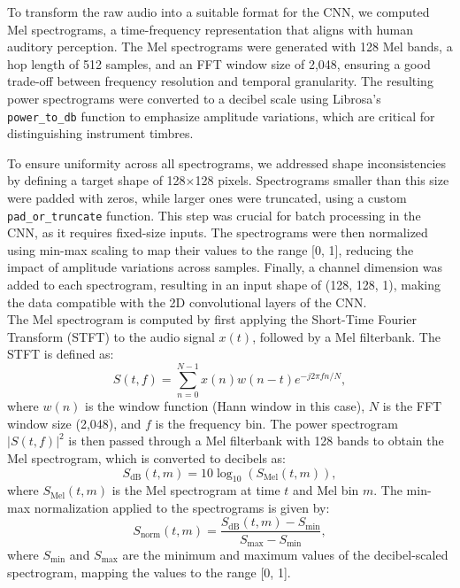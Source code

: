 \documentclass[conference]{IEEEtran}
\begin{document}
To transform the raw audio into a suitable format for the CNN, we computed Mel spectrograms, a time-frequency representation that aligns with human auditory perception. The Mel spectrograms were generated with 128 Mel bands, a hop length of 512 samples, and an FFT window size of 2,048, ensuring a good trade-off between frequency resolution and temporal granularity. The resulting power spectrograms were converted to a decibel scale using Librosa’s \texttt{power\_to\_db} function to emphasize amplitude variations, which are critical for distinguishing instrument timbres.

To ensure uniformity across all spectrograms, we addressed shape inconsistencies by defining a target shape of 128$\times$128 pixels. Spectrograms smaller than this size were padded with zeros, while larger ones were truncated, using a custom \texttt{pad\_or\_truncate} function. This step was crucial for batch processing in the CNN, as it requires fixed-size inputs. The spectrograms were then normalized using min-max scaling to map their values to the range [0, 1], reducing the impact of amplitude variations across samples. Finally, a channel dimension was added to each spectrogram, resulting in an input shape of (128, 128, 1), making the data compatible with the 2D convolutional layers of the CNN. \\[3pt]
The Mel spectrogram is computed by first applying the Short-Time Fourier Transform (STFT) to the audio signal \( x(t) \), followed by a Mel filterbank. The STFT is defined as:
\begin{equation}
S(t, f) = \sum_{n=0}^{N-1} x(n) w(n-t) e^{-j2\pi fn/N},
\label{eq:stft}
\end{equation}
where \( w(n) \) is the window function (Hann window in this case), \( N \) is the FFT window size (2,048), and \( f \) is the frequency bin. The power spectrogram \( |S(t, f)|^2 \) is then passed through a Mel filterbank with 128 bands to obtain the Mel spectrogram, which is converted to decibels as:
\begin{equation}
S_{\text{dB}}(t, m) = 10 \log_{10}(S_{\text{Mel}}(t, m)),
\label{eq:mel_db}
\end{equation}
where \( S_{\text{Mel}}(t, m) \) is the Mel spectrogram at time \( t \) and Mel bin \( m \).
The min-max normalization applied to the spectrograms is given by:
\begin{equation}
S_{\text{norm}}(t, m) = \frac{S_{\text{dB}}(t, m) - S_{\text{min}}}{S_{\text{max}} - S_{\text{min}}},
\label{eq:min_max}
\end{equation}
where \( S_{\text{min}} \) and \( S_{\text{max}} \) are the minimum and maximum values of the decibel-scaled spectrogram, mapping the values to the range [0, 1].
\end{document}
